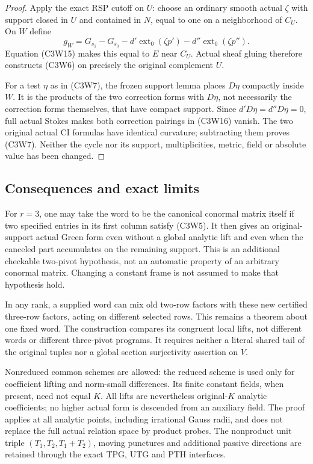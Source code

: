 \begin{proof}
Apply the exact RSP cutoff on $U$: choose an ordinary smooth
actual $\zeta$ with support closed in $U$ and contained in $N$,
equal to one on a neighborhood of $C_U$.  On $W$ define
\[
 g_W=G_{s_1}-G_{s_0}
              -d'\operatorname{ext}_0(\zeta p')
              -d''\operatorname{ext}_0(\zeta p'').
 \tag{C3W16}
\]
Equation (C3W15) makes this equal to $E$ near $C_U$.  Actual
sheaf gluing therefore constructs (C3W6) on precisely the
original complement $U$.

For a test $\eta$ as in (C3W7), the frozen support lemma places
$D\eta$ compactly inside $W$.  It is the products of the two
correction forms with $D\eta$, not necessarily the correction
forms themselves, that have compact support.  Since
$d'D\eta=d''D\eta=0$, full actual Stokes makes both correction
pairings in (C3W16) vanish.  The two original actual CI formulas
have identical curvature; subtracting them proves (C3W7).
Neither the cycle nor its support, multiplicities, metric, field
or absolute value has been changed.
\end{proof}

\subsection{Consequences and exact limits}

For $r=3$, one may take the word to be the canonical conormal
matrix itself if two specified entries in its first column
satisfy (C3W5).  It then gives an original-support actual Green
form even without a global analytic lift and even when the
canceled part accumulates on the remaining support.  This is
an additional checkable two-pivot hypothesis, not an automatic
property of an arbitrary conormal matrix.  Changing a constant
frame is not assumed to make that hypothesis hold.

In any rank, a supplied word can mix old two-row factors with
these new certified three-row factors, acting on different
selected rows.  This remains a theorem about one fixed word.
The construction compares its congruent local lifts, not different
words or different three-pivot programs.  It requires neither a
literal shared tail of the original tuples nor a global section
surjectivity assertion on $V$.

Nonreduced common schemes are allowed: the reduced scheme is
used only for coefficient lifting and norm-small differences.
Its finite constant fields, when present, need not equal $K$.
All lifts are nevertheless original-$K$ analytic coefficients;
no higher actual form is descended from an auxiliary field.
The proof applies at all analytic points, including irrational
Gauss radii, and does not replace the full actual relation space
by product probes.  The nonproduct unit triple
$(T_1,T_2,T_1+T_2)$, moving punctures and additional passive
directions are retained through the exact TPG, UTG and PTH
interfaces.

